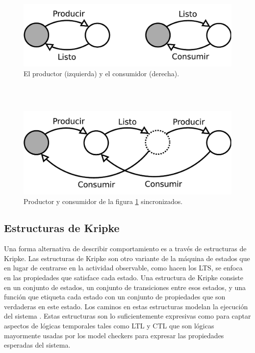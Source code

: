 \documentclass[titlepage, 12pt]{book}
\begin{document}
\begin{figure}[htp] %
  \centering
    \includegraphics[scale=0.75]{Imagenes/prodYcons.pdf}
  \caption{El productor (izquierda) y el consumidor (derecha).}
  \label{figura1}
\end{figure}
~\\\\

\begin{figure}[htp] %
  \centering
    \includegraphics[scale=0.75]{Imagenes/prodYconsSincro.pdf}
  \caption{Productor y consumidor de la figura \ref{figura1} sincronizados.}
  \label{figura2}
\end{figure}


\subsection*{Estructuras de Kripke}
Una forma alternativa de describir comportamiento es a trav\'es de estructuras de Kripke. Las estructuras de Kripke son otro variante de la m\'aquina de estados que en lugar de centrarse en la actividad observable, como hacen los LTS, se enfoca en las propiedades que satisface cada estado. Una estructura de Kripke consiste en un conjunto de estados, un conjunto de transiciones entre esos estados, y una funci\'on que etiqueta cada estado con un conjunto de propiedades que son verdaderas en este estado. Los caminos en estas estructuras modelan la ejecuci\'on del sistema \cite{Clarke}. Estas estructuras son lo suficientemente expresivas como para captar aspectos de l\'ogicas temporales tales como LTL y CTL que son l\'ogicas mayormente usadas por los model checkers para expresar las propiedades esperadas del sistema.
\end{document}
